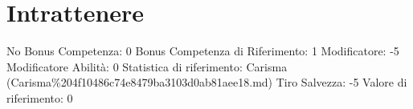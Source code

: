 \section{Intrattenere}\label{intrattenere}

\begin{description}
\tightlist
\item[Tags: ABI]
No Bonus Competenza: 0 Bonus Competenza di Riferimento: 1 Modificatore:
-5 Modificatore Abilità: 0 Statistica di riferimento: Carisma
(Carisma\%204f10486c74e8479ba3103d0ab81aee18.md) Tiro Salvezza: -5
Valore di riferimento: 0
\end{description}
